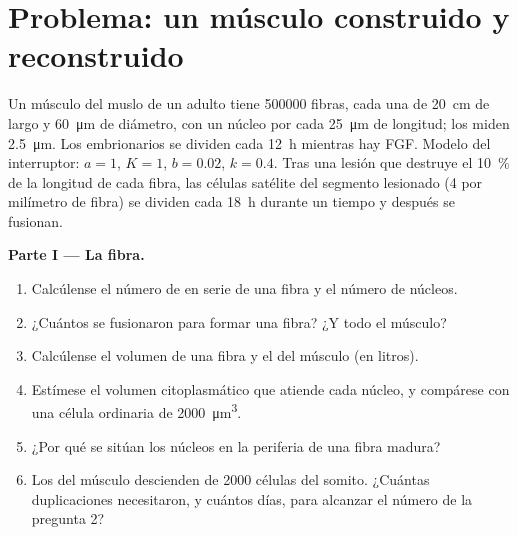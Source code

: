 \section{Problema: un músculo construido y reconstruido}

\begin{problem}
\label{pb:b2:cell-differentiation:1}
Un músculo del muslo de un adulto tiene \num{500000} fibras, cada una de
\qty{20}{cm} de largo y \qty{60}{\micro m} de diámetro, con un núcleo por
cada \qty{25}{\micro m} de longitud; los  miden
\qty{2.5}{\micro m}. Los  embrionarios se dividen cada
\qty{12}{h} mientras hay FGF. Modelo del interruptor: $a = 1$, $K = 1$,
$b = 0.02$, $k
= 0.4$. Tras una lesión que destruye el \qty{10}{\%} de la longitud de
cada fibra, las células satélite del segmento lesionado (\num{4} por
milímetro de fibra) se dividen cada \qty{18}{h} durante un tiempo y
después se fusionan.

\medskip
\noindent\textbf{Parte I --- La fibra.}
\begin{enumerate}
  \item Calcúlense el número de  en serie de una fibra y el
        número de núcleos.
  \item ¿Cuántos  se fusionaron para formar una fibra? ¿Y todo
        el músculo?
  \item Calcúlense el volumen de una fibra y el del músculo (en litros).
  \item Estímese el volumen citoplasmático que atiende cada núcleo, y
        compárese con una célula ordinaria de \qty{2000}{\micro m^3}.
  \item ¿Por qué se sitúan los núcleos en la periferia de una fibra
        madura?
  \item Los  del músculo descienden de \num{2000} células del
        somito. ¿Cuántas duplicaciones necesitaron, y cuántos días, para
        alcanzar el número de la pregunta 2?
\end{enumerate}


\end{problem}
